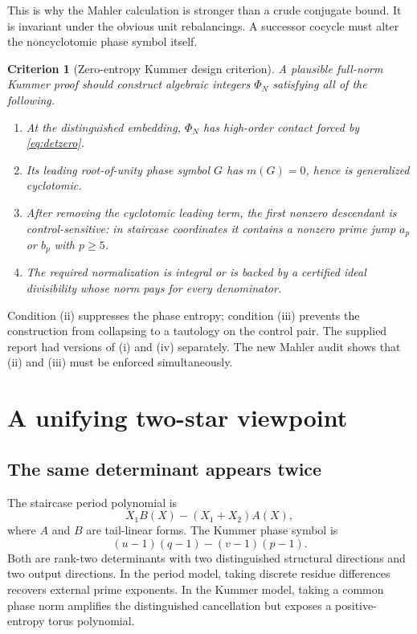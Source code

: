 \documentclass[11pt]{article}
\newtheorem{criterion}[theorem]{Criterion}
\theoremstyle{definition}
\theoremstyle{remark}
\begin{document}
This is why the Mahler calculation is stronger than a crude conjugate bound.
It is invariant under the obvious unit rebalancings.  A successor cocycle must
alter the noncyclotomic phase symbol itself.

\begin{criterion}[Zero-entropy Kummer design criterion]\label{crit:zeroentropy}
A plausible full-norm Kummer proof should construct algebraic integers
$\Phi_N$ satisfying all of the following.
\begin{enumerate}[label=\textup{(\roman*)}]
\item At the distinguished embedding, $\Phi_N$ has high-order contact forced by
\eqref{eq:detzero}.
\item Its leading root-of-unity phase symbol $G$ has $m(G)=0$, hence is
generalized cyclotomic.
\item After removing the cyclotomic leading term, the first nonzero descendant is
control-sensitive: in staircase coordinates it contains a nonzero prime jump
$a_p$ or $b_p$ with $p\ge5$.
\item The required normalization is integral or is backed by a certified ideal
divisibility whose norm pays for every denominator.
\end{enumerate}
\end{criterion}

Condition (ii) suppresses the phase entropy; condition (iii) prevents the
construction from collapsing to a tautology on the control pair.  The supplied
report had versions of (i) and (iv) separately.  The new Mahler audit shows that
(ii) and (iii) must be enforced simultaneously.

\section{A unifying two-star viewpoint}

\subsection{The same determinant appears twice}

The staircase period polynomial is
\begin{equation}\label{eq:twostarperiod}
 X_1B(X)-(X_1+X_2)A(X),
\end{equation}
where $A$ and $B$ are tail-linear forms.  The Kummer phase symbol is
\begin{equation}\label{eq:twostarphase}
 (u-1)(q-1)-(v-1)(p-1).
\end{equation}
Both are rank-two determinants with two distinguished structural directions and
two output directions.  In the period model, taking discrete residue differences
recovers external prime exponents.  In the Kummer model, taking a common phase
norm amplifies the distinguished cancellation but exposes a positive-entropy
torus polynomial.
\end{document}
